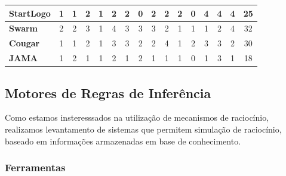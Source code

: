 \begin{table}[htb!]
\begin{tabular}{|l|l|l|l|l|l|l|l|l|l|l|l|l|l|l|l|}
\hline
\textbf{StartLogo} & \multicolumn{1}{c|}{1} & \multicolumn{1}{c|}{1} & \multicolumn{1}{c|}{2} & \multicolumn{1}{c|}{1} & \multicolumn{1}{c|}{2} & \multicolumn{1}{c|}{2} & \multicolumn{1}{c|}{0} & \multicolumn{1}{c|}{2} & \multicolumn{1}{c|}{2} & \multicolumn{1}{c|}{2} & \multicolumn{1}{c|}{0} & \multicolumn{1}{c|}{4} & \multicolumn{1}{c|}{4} & \multicolumn{1}{c|}{4} & \multicolumn{1}{c|}{25} \\ 
\hline
\textbf{Swarm} & \multicolumn{1}{c|}{2} & \multicolumn{1}{c|}{2} & \multicolumn{1}{c|}{3} & \multicolumn{1}{c|}{1} & \multicolumn{1}{c|}{4} & \multicolumn{1}{c|}{3} & \multicolumn{1}{c|}{3} & \multicolumn{1}{c|}{3} & \multicolumn{1}{c|}{2} & \multicolumn{1}{c|}{1} & \multicolumn{1}{c|}{1} & \multicolumn{1}{c|}{1} & \multicolumn{1}{c|}{2} & \multicolumn{1}{c|}{4} & \multicolumn{1}{c|}{32} \\ 
\hline
\textbf{Cougar} & \multicolumn{1}{c|}{1} & \multicolumn{1}{c|}{1} & \multicolumn{1}{c|}{2} & \multicolumn{1}{c|}{1} & \multicolumn{1}{c|}{3} & \multicolumn{1}{c|}{3} & \multicolumn{1}{c|}{2} & \multicolumn{1}{c|}{2} & \multicolumn{1}{c|}{4} & \multicolumn{1}{c|}{1} & \multicolumn{1}{c|}{2} & \multicolumn{1}{c|}{3} & \multicolumn{1}{c|}{3} & \multicolumn{1}{c|}{2} & \multicolumn{1}{c|}{30} \\ 
\hline
\textbf{JAMA} & \multicolumn{1}{c|}{1} & \multicolumn{1}{c|}{2} & \multicolumn{1}{c|}{1} & \multicolumn{1}{c|}{1} & \multicolumn{1}{c|}{2} & \multicolumn{1}{c|}{1} & \multicolumn{1}{c|}{2} & \multicolumn{1}{c|}{1} & \multicolumn{1}{c|}{1} & \multicolumn{1}{c|}{1} & \multicolumn{1}{c|}{0} & \multicolumn{1}{c|}{1} & \multicolumn{1}{c|}{3} & \multicolumn{1}{c|}{1} & \multicolumn{1}{c|}{18} \\ 
\hline
\end{tabular}

\end{table}


\newpage
\subsection{Motores de Regras de Inferência} \label{sec:RegraInfer}

Como estamos insteresssados na utilização de mecanismos de raciocínio, realizamos levantamento de sistemas que permitem simulação de raciocínio, baseado em informações armazenadas em base de conhecimento.

\subsubsection{Ferramentas}

